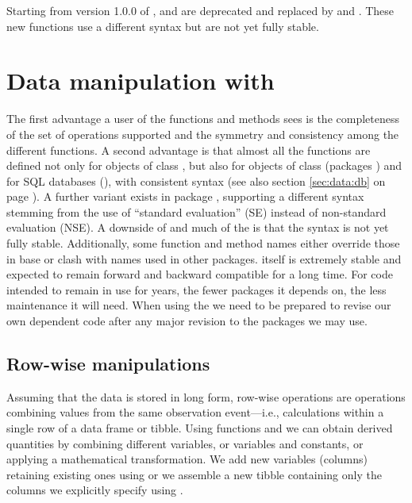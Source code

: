 \documentclass[krantz2]{krantz}\usepackage{knitr}
\begin{document}
\begin{warningbox}
  Starting from version 1.0.0 of ,  and  are deprecated and replaced by  and . These new functions use a different syntax but are not yet fully stable.
\end{warningbox}


\section{Data manipulation with }
\begin{warningbox}
The first advantage a user of the  functions and methods sees is the completeness of the set of operations supported and the symmetry and consistency among the different functions. A second advantage is that almost all the functions are defined not only for objects of class , but also for objects of class  (packages ) and for SQL databases (), with consistent syntax (see also section \ref{sec:data:db} on page \pageref{sec:data:db}). A further variant exists in package , supporting a different syntax stemming from the use of ``standard evaluation'' (SE) instead of non-standard evaluation (NSE). A downside of  and much of the  is that the syntax is not yet fully stable. Additionally, some function and method names either override those in base \Rlang or clash with names used in other packages. \Rlang itself is extremely stable and expected to remain forward and backward compatible for a long time. For code intended to remain in use for years, the fewer packages it depends on, the less maintenance it will need. When using the  we need to be prepared to revise our own dependent code after any major revision to the  packages we may use.
\end{warningbox}

\subsection{Row-wise manipulations}

Assuming that the data is stored in long form, row-wise operations are operations combining values from the same observation event---i.e., calculations within a single row of a data frame or tibble. Using functions  and  we can obtain derived quantities by combining different variables, or variables and constants, or applying a mathematical transformation. We add new variables (columns) retaining existing ones using  or we assemble a new tibble containing only the columns we explicitly specify using .
\end{document}
